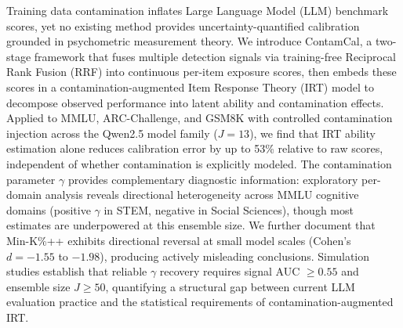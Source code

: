 Training data contamination inflates Large Language Model (LLM) benchmark scores, yet no existing method provides uncertainty-quantified calibration grounded in psychometric measurement theory. We introduce ContamCal, a two-stage framework that fuses multiple detection signals via training-free Reciprocal Rank Fusion (RRF) into continuous per-item exposure scores, then embeds these scores in a contamination-augmented Item Response Theory (IRT) model to decompose observed performance into latent ability and contamination effects. Applied to MMLU, ARC-Challenge, and GSM8K with controlled contamination injection across the Qwen2.5 model family ($J=13$), we find that IRT ability estimation alone reduces calibration error by up to 53\% relative to raw scores, independent of whether contamination is explicitly modeled. The contamination parameter $\gamma$ provides complementary diagnostic information: exploratory per-domain analysis reveals directional heterogeneity across MMLU cognitive domains (positive $\gamma$ in STEM, negative in Social Sciences), though most estimates are underpowered at this ensemble size. We further document that Min-K\%++ exhibits directional reversal at small model scales (Cohen's $d = -1.55$ to $-1.98$), producing actively misleading conclusions. Simulation studies establish that reliable $\gamma$ recovery requires signal AUC $\geq 0.55$ and ensemble size $J \geq 50$, quantifying a structural gap between current LLM evaluation practice and the statistical requirements of contamination-augmented IRT.